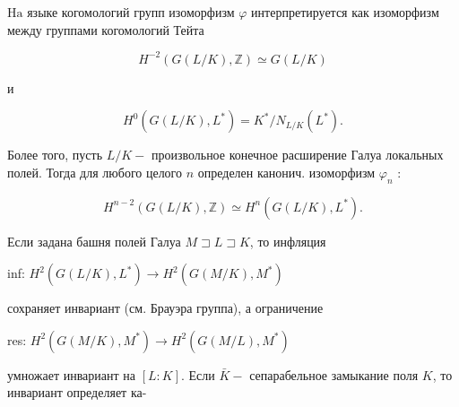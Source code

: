 \documentclass[10pt]{article}
\begin{document}
$\mathrm{Ha}$ языке когомологий групп изоморфизм $\varphi$ интерпретируется как изоморфизм между группами когомологий Тейта



\[

H^{-2}(G(L / K), \mathbb{Z}) \simeq G(L / K)

\]



и



\[

H^{0}\left(G(L / K), L^{*}\right)=K^{*} / N_{L / K}\left(L^{*}\right) .

\]



Более того, пусть $L / K-$ произвольное конечное расширение Галуа локальных полей. Тогда для любого целого $n$ определен канонич. изоморфизм $\varphi_{n}$ :



\[

H^{n-2}(G(L / K), \mathbb{Z}) \simeq H^{n}\left(G(L / K), L^{*}\right) .

\]



Если задана башня полей Галуа $M \sqsupset L \sqsupset K$, то инфляция



inf: $H^{2}\left(G(L / K), L^{*}\right) \longrightarrow H^{2}\left(G(M / K), M^{*}\right)$



сохраняет инвариант (см. Брауэра группа), а ограничение



res: $H^{2}\left(G(M / K), M^{*}\right) \longrightarrow H^{2}\left(G(M / L), M^{*}\right)$



умножает инвариант на $[L: K]$. Если $\bar{K}-$ сепарабельное замыкание поля $K$, то инвариант определяет ка-
\end{document}
